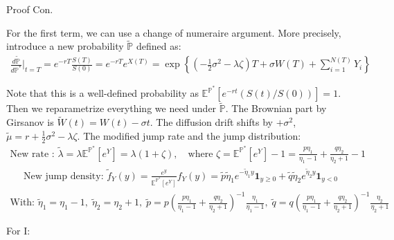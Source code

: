 \documentclass{beamer}
\begin{document}
\begin{frame}{Proof Con.}

    
    {\footnotesize \scriptsize
    \par For the first term, we can use a change of numeraire argument. More precisely, introduce a new probability \(\tilde{\mathbb{P}}\) defined as:
     {\footnotesize \tiny
    \begin{align*}
        \frac{d \tilde{\mathbb{P}}}{d \mathbb{P}^*} \bigg|_{t=T} = e^{-rT} \frac{S(T)}{S(0)} = e^{-rT} e^{X(T)} 
    = \exp \left\{ \left( -\frac{1}{2} \sigma^2 - \lambda \zeta \right) T + \sigma W(T) + \sum_{i=1}^{N(T)} Y_i \right\}
    \end{align*}
    }
    \par Note that this is a well-defined probability as $\mathbb{E}^{\mathbb{P}^*}[e^{-rt}(S(t)/S(0))] = 1$. Then we 
    reparametrize everything we need under  \(\tilde{\mathbb{P}}\). The Brownian part by Girsanov is $\tilde{W}(t) = W(t) - \sigma t$. 
    The diffusion drift shifts by \(+\sigma^2\), $\tilde{\mu} = r + \frac{1}{2}\sigma^2 - \lambda\zeta$. 
    The modified jump rate and the jump distribution:
    {\footnotesize \tiny
    \begin{align*}
        \text{New rate : } \tilde{\lambda} = \lambda\mathbb{E}^{\mathbb{P}^*}[e^Y] 
        = \lambda(1 + \zeta), \quad \text{where } \zeta = \mathbb{E}^{\mathbb{P}^*}[e^Y] - 1 = \frac{p\eta_1}{\eta_1 - 1} + \frac{q\eta_2}{\eta_2 + 1} - 1
    \end{align*}
    }
    \vspace{-2em}
    {\footnotesize \tiny
    \begin{align*}
        \text{New jump density: }\tilde{f}_Y(y) = \frac{e^y}{\mathbb{E}^{\mathbb{P}^*}[e^Y]} f_Y(y) 
        = \tilde{p}\tilde{\eta}_1 e^{-\tilde{\eta}_1 y}\mathbf{1}_{y\geq 0} + \tilde{q}\tilde{\eta}_2 e^{\tilde{\eta}_2 y}\mathbf{1}_{y<0}
    \end{align*}
    }
     \vspace{-2em}
    {\footnotesize \tiny
    \begin{align*}
        \text{With: } \tilde{\eta}_1 = \eta_1 - 1,\;\tilde{\eta}_2 = \eta_2 + 1,\;\tilde{p} = p\left(\frac{p\eta_1}{\eta_1 - 1}
         + \frac{q\eta_2}{\eta_2 + 1}\right)^{-1} \frac{\eta_1}{\eta_1 - 1},
         \; \tilde{q} = q\left(\frac{p\eta_1}{\eta_1 - 1} + \frac{q\eta_2}{\eta_2 + 1}\right)^{-1} \frac{\eta_2}{\eta_2 + 1}
    \end{align*}
    }
    \par For I:
    \vspace{-2em}
}
\end{frame}
\end{document}
